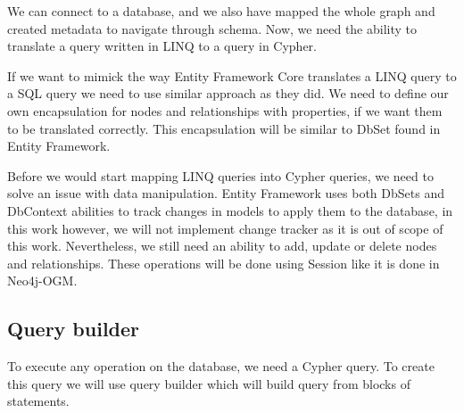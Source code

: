 We can connect to a database, and we also have mapped the whole graph and created metadata to navigate through schema. Now, we need the ability to translate a query written in LINQ to a query in Cypher.

If we want to mimick the way Entity Framework Core translates a LINQ query to a SQL query we need to use similar approach as they did. We need to define our own encapsulation for nodes
and relationships with properties, if we want them to be translated correctly. This encapsulation will be similar to DbSet found in Entity Framework.

Before we would start mapping LINQ queries into Cypher queries, we need to solve an issue with data manipulation. Entity Framework uses both DbSets and DbContext abilities to track
changes in models to apply them to the database, in this work however, we will not implement change tracker as it is out of scope of this work. Nevertheless, we still
need an ability to add, update or delete nodes and relationships. These operations will be done using Session like it is done in Neo4j-OGM.

\subsection{Query builder}

To execute any operation on the database, we need a Cypher query. To create this query we will use query builder which will build query from blocks of statements.
